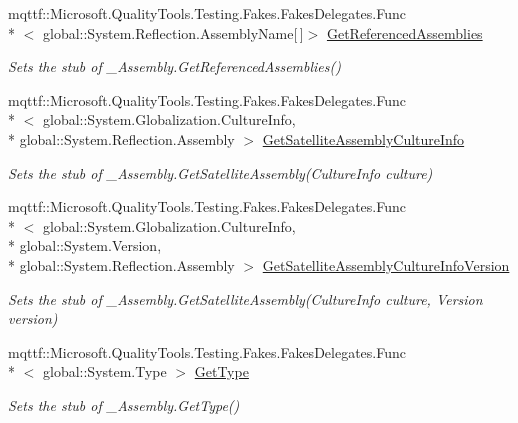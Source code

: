 \begin{DoxyCompactItemize}
mqttf\-::\-Microsoft.\-Quality\-Tools.\-Testing.\-Fakes.\-Fakes\-Delegates.\-Func\\*
$<$ global\-::\-System.\-Reflection.\-Assembly\-Name\mbox{[}$\,$\mbox{]}$>$ \hyperlink{class_system_1_1_runtime_1_1_interop_services_1_1_fakes_1_1_stub___assembly_aa58ecc6e2c61a71dab0cff6687ad5932}{Get\-Referenced\-Assemblies}
\begin{DoxyCompactList}\small\item\em Sets the stub of \-\_\-\-Assembly.\-Get\-Referenced\-Assemblies()\end{DoxyCompactList}\item 
mqttf\-::\-Microsoft.\-Quality\-Tools.\-Testing.\-Fakes.\-Fakes\-Delegates.\-Func\\*
$<$ global\-::\-System.\-Globalization.\-Culture\-Info, \\*
global\-::\-System.\-Reflection.\-Assembly $>$ \hyperlink{class_system_1_1_runtime_1_1_interop_services_1_1_fakes_1_1_stub___assembly_ab34b0d6d51d1991dfd06565feaa00f94}{Get\-Satellite\-Assembly\-Culture\-Info}
\begin{DoxyCompactList}\small\item\em Sets the stub of \-\_\-\-Assembly.\-Get\-Satellite\-Assembly(\-Culture\-Info culture)\end{DoxyCompactList}\item 
mqttf\-::\-Microsoft.\-Quality\-Tools.\-Testing.\-Fakes.\-Fakes\-Delegates.\-Func\\*
$<$ global\-::\-System.\-Globalization.\-Culture\-Info, \\*
global\-::\-System.\-Version, \\*
global\-::\-System.\-Reflection.\-Assembly $>$ \hyperlink{class_system_1_1_runtime_1_1_interop_services_1_1_fakes_1_1_stub___assembly_ac932f4ac90691445b6b7be931033350a}{Get\-Satellite\-Assembly\-Culture\-Info\-Version}
\begin{DoxyCompactList}\small\item\em Sets the stub of \-\_\-\-Assembly.\-Get\-Satellite\-Assembly(\-Culture\-Info culture, Version version)\end{DoxyCompactList}\item 
mqttf\-::\-Microsoft.\-Quality\-Tools.\-Testing.\-Fakes.\-Fakes\-Delegates.\-Func\\*
$<$ global\-::\-System.\-Type $>$ \hyperlink{class_system_1_1_runtime_1_1_interop_services_1_1_fakes_1_1_stub___assembly_a7301af6918525d4a463f27e1b6423bf6}{Get\-Type}
\begin{DoxyCompactList}\small\item\em Sets the stub of \-\_\-\-Assembly.\-Get\-Type()\end{DoxyCompactList}\item 

\end{DoxyCompactItemize}
